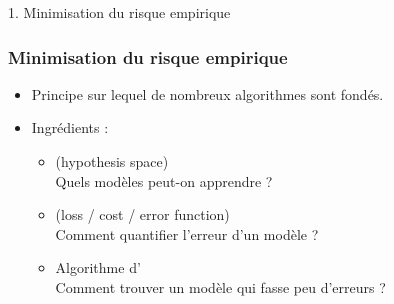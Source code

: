 \begin{frame}
  \begin{center}
    \large{1. Minimisation du risque empirique}
  \end{center}
\end{frame}

\begin{frame}
  \frametitle{Minimisation du risque empirique}
  \begin{itemize}
  \item Principe sur lequel de nombreux algorithmes  sont fondés.
  \item Ingrédients :
    \begin{itemize}
    \setlength{\itemsep}{5pt}
    \item {} \textcolor{gray!70}{(hypothesis space)} \\ \hspace{1em} Quels modèles peut-on apprendre ?
    \item {} \textcolor{gray!70}{(loss / cost / error function)} \\ \hspace{1em} Comment quantifier l'erreur d'un modèle ?
    \item Algorithme d' \\ \hspace{1em} Comment trouver un
      modèle qui fasse peu d'erreurs ?
    \end{itemize}
  \end{itemize}
\end{frame}

